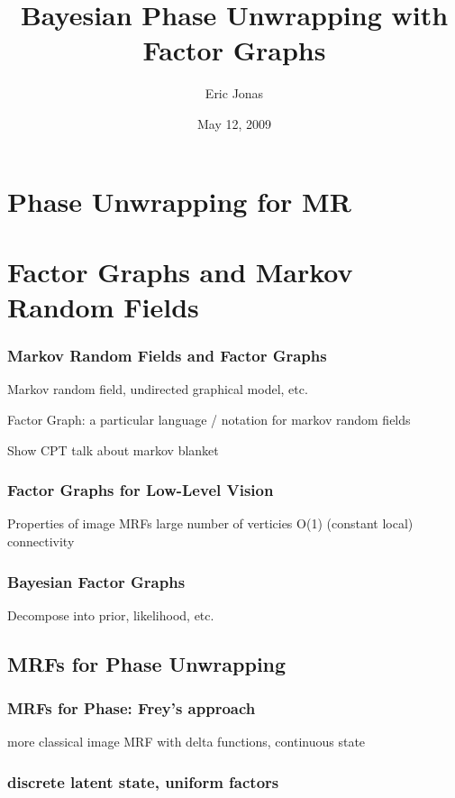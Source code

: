 \documentclass{beamer}
\title{Bayesian Phase Unwrapping with Factor Graphs}
\author{Eric Jonas}
\date{May 12, 2009}
\institute[6.556]{MIT Department of Brain and Cognitive Sciences}
\begin{document}
\begin{frame}
\maketitle
\end{frame}

\section{Phase Unwrapping for MR}
\begin{frame}

\end{frame}

\section{Factor Graphs and Markov Random Fields}

\begin{frame}
\frametitle{Markov Random Fields and Factor Graphs}

Markov random field, undirected graphical model, etc. 

Factor Graph: a particular language / notation for markov random fields

Show CPT
talk about markov blanket

\cite{Kschischang01}
\end{frame}

\begin{frame} 
\frametitle{Factor Graphs for Low-Level Vision}
Properties of image MRFs
large number of verticies
O(1) (constant local) connectivity
\end{frame}

\begin{frame}
\frametitle{Bayesian Factor Graphs}
Decompose into prior, likelihood, etc. 
\end{frame}

\subsection{MRFs for Phase Unwrapping}

\begin{frame} 
\frametitle{MRFs for Phase: Frey's approach}
more classical image MRF with delta functions, continuous state
\end{frame}

\begin{frame}
\frametitle{discrete latent state, uniform factors}
\end{frame}
\end{document}
